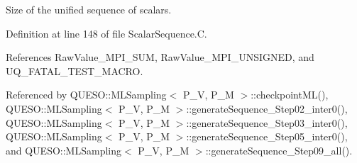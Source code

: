 Size of the unified sequence of scalars. 



Definition at line 148 of file Scalar\-Sequence.\-C.



References Raw\-Value\-\_\-\-M\-P\-I\-\_\-\-S\-U\-M, Raw\-Value\-\_\-\-M\-P\-I\-\_\-\-U\-N\-S\-I\-G\-N\-E\-D, and U\-Q\-\_\-\-F\-A\-T\-A\-L\-\_\-\-T\-E\-S\-T\-\_\-\-M\-A\-C\-R\-O.



Referenced by Q\-U\-E\-S\-O\-::\-M\-L\-Sampling$<$ P\-\_\-\-V, P\-\_\-\-M $>$\-::checkpoint\-M\-L(), Q\-U\-E\-S\-O\-::\-M\-L\-Sampling$<$ P\-\_\-\-V, P\-\_\-\-M $>$\-::generate\-Sequence\-\_\-\-Step02\-\_\-inter0(), Q\-U\-E\-S\-O\-::\-M\-L\-Sampling$<$ P\-\_\-\-V, P\-\_\-\-M $>$\-::generate\-Sequence\-\_\-\-Step03\-\_\-inter0(), Q\-U\-E\-S\-O\-::\-M\-L\-Sampling$<$ P\-\_\-\-V, P\-\_\-\-M $>$\-::generate\-Sequence\-\_\-\-Step05\-\_\-inter0(), and Q\-U\-E\-S\-O\-::\-M\-L\-Sampling$<$ P\-\_\-\-V, P\-\_\-\-M $>$\-::generate\-Sequence\-\_\-\-Step09\-\_\-all().


